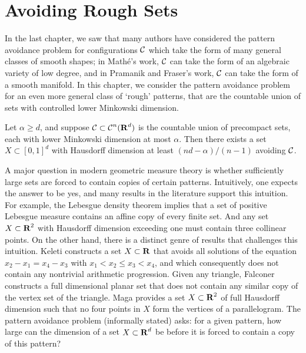 
\chapter{Avoiding Rough Sets}
\label{ch:RoughSets}

In the last chapter, we saw that many authors have considered the pattern avoidance problem for configurations $\operatorname{\mathcal{C}}$ which take the form of many general classes of smooth shapes; in Math\'{e}'s work, $\operatorname{\mathcal{C}}$ can take the form of an algebraic variety of low degree, and in Pramanik and Fraser's work, $\operatorname{\mathcal{C}}$ can take the form of a smooth manifold. In this chapter, we consider the pattern avoidance problem for an even more general class of `rough' patterns, that are the countable union of sets with controlled lower Minkowski dimension.
%
\begin{theorem}\label{mainTheorem}
	Let $\alpha \geq d$, and suppose $\operatorname{\mathcal{C}} \subset \operatorname{\mathcal{C}}^n(\operatorname{\mathbf{R}}^d)$ is the countable union of precompact sets, each with lower Minkowski dimension at most $\alpha$. Then there exists a set $X \subset [0,1]^d$ with Hausdorff dimension at least $(nd - \alpha)/(n-1)$ avoiding $\operatorname{\mathcal{C}}$.
\end{theorem}





A major question in modern geometric measure theory is whether sufficiently large sets are forced to contain copies of certain patterns. Intuitively, one expects the answer to be yes, and many results in the literature support this intuition. For example, the Lebesgue density theorem implies that a set of positive Lebesgue measure contains an affine copy of every finite set. And any set $X \subset \operatorname{\mathbf{R}}^2$ with Hausdorff dimension exceeding one must contain three collinear points. On the other hand, there is a distinct genre of results that challenges this intuition. Keleti \cite{KeletiDimOneSet} constructs a set $X \subset \operatorname{\mathbf{R}}$ that avoids all solutions of the equation $x_2 - x_1 = x_4 - x_3$ with $x_1 < x_2 \leq x_3 < x_4$, and which consequently does not contain any nontrivial arithmetic progression. Given any triangle, Falconer \cite{FalconerPaper} constructs a full dimensional planar set that does not contain any similar copy of the vertex set of the triangle. Maga \cite{Maga} provides a set $X \subset \operatorname{\mathbf{R}}^2$ of full Hausdorff dimension such that no four points in $X$ form the vertices of a parallelogram. The pattern avoidance problem (informally stated) asks: for a given pattern, how large can the dimension of a set $X \subset \operatorname{\mathbf{R}}^d$ be before it is forced to contain a copy of this pattern? 

